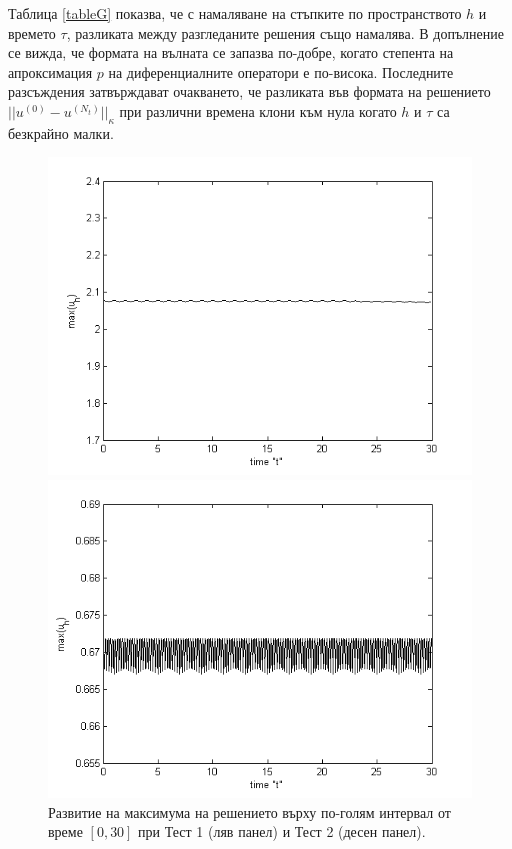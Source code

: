 \documentclass{article}
\begin{document}
Таблица \ref{tableG} показва, че с намаляване на стъпките по пространството $h$ и времето $\tau$, разликата между разгледаните решения също намалява. В допълнение се вижда, че формата на вълната се запазва по-добре, когато степента на апроксимация $p$ на диференциалните оператори е по-висока. Последните разсъждения затвърждават очакването, че разликата във формата на решението $||u^{(0)} - u^{(N_t)}||_\kappa$ при различни времена клони към нула когато $h$ и $\tau$ са безкрайно малки.

\begin{figure}\vspace{0.2cm}
	\centering
	\begin{minipage}[b]{0.40\linewidth}
		\includegraphics[width=\linewidth]{../amitans/figures/maximum_30_T30_bt3_c045_h005.png}
	\end{minipage}	
	\begin{minipage}[b]{0.40\linewidth}
		 \includegraphics[width=\linewidth]{../amitans/figures/maximum_30_T30_bt1_c090_h020.png}
	\end{minipage}
\caption{Развитие на максимума на решението върху по-голям интервал от време $[0, 30]$ при Тест 1 (ляв панел) и Тест 2 (десен панел).}
\label{Maximum}
\end{figure}
\end{document}
